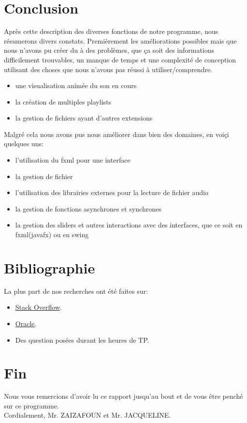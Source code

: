 \documentclass[a4paper,12pt]{report} %
\begin{document}
\section{Conclusion}
	Après cette description des diverses fonctions de notre programme, nous résumerons divers constats. Premièrement les améliorations possibles mais que nous n'avons pu créer du à des problèmes, que ça soit des informations difficilement trouvables, un manque de temps et une complexité de conception utilisant des choses que nous n'avons pas réussi à utiliser/comprendre.
	\begin{itemize}
		\item une visualisation animée du son en cours
		\item la création de multiples playlists
		\item la gestion de fichiers ayant d'autres extensions
	\end{itemize}
	
	Malgré cela nous avons pus nous améliorer dans bien des domaines, en voiçi quelques uns:
	\begin{itemize}
		\item l'utilisation du fxml pour une interface
		\item la gestion de fichier
		\item l'utilisation des librairies externes pour la lecture de fichier audio
		\item la gestion de fonctions asynchrones et synchrones
		\item la gestion des sliders et autres interactions avec des interfaces, que ce soit en fxml(javafx) ou en swing
	\end{itemize}
	

\newpage
\section{Bibliographie}
	La plus part de nos recherches ont été faites sur:
	
	\begin{itemize}
		\item \href{https://stackoverflow.com/}{\underline{Stack Overflow}}.
		\item \href{https://docs.oracle.com/javase/8/}{\underline{Oracle}}.
		\item Des question posées durant les heures de TP. 
	\end{itemize}
	
\section{Fin}
	
	Nous vous remercions d'avoir lu ce rapport jusqu'au bout et de vous être penché sur ce programme.\\	
	Cordialement, Mr. ZAIZAFOUN et Mr. JACQUELINE.
\end{document}
